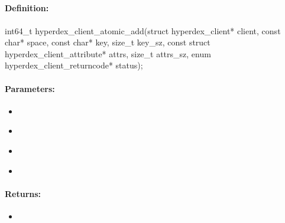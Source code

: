 \pagebreak
\subsection{}
\label{api:c:atomic_add}


\paragraph{Definition:}
\begin{ccode}
int64_t hyperdex_client_atomic_add(struct hyperdex_client* client,
        const char* space,
        const char* key, size_t key_sz,
        const struct hyperdex_client_attribute* attrs, size_t attrs_sz,
        enum hyperdex_client_returncode* status);
\end{ccode}

\paragraph{Parameters:}
\begin{itemize}[noitemsep]
\item {}\\

\item {}\\

\item {}\\

\item {}\\

\end{itemize}

\paragraph{Returns:}
\begin{itemize}[noitemsep]
\item {}\\

\end{itemize}

